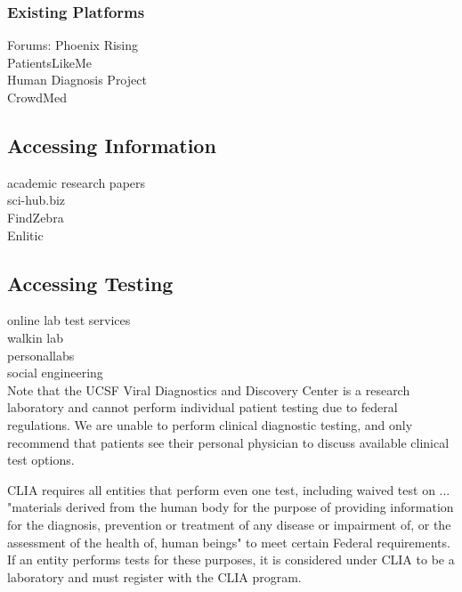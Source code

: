 \documentclass{article}
\begin{document}
\subsubsection{Existing Platforms}
Forums: Phoenix Rising\\
PatientsLikeMe\\
Human Diagnosis Project\\
CrowdMed\\

\subsection{Accessing Information}
academic research papers\\
sci-hub.biz\\
FindZebra\\
Enlitic

\cite{scholz2016platform}



\subsection{Accessing Testing}


online lab test services\\
walkin lab\\
personallabs\\
social engineering\\



Note that the UCSF Viral Diagnostics and Discovery Center is a research laboratory and cannot perform individual patient testing due to federal regulations. We are unable to perform clinical diagnostic testing, and only recommend that patients see their personal physician to discuss available clinical test options.

CLIA requires all entities that perform even one test, including waived test on ... "materials derived from the human body for the purpose of providing information for the diagnosis, prevention or treatment of any disease or impairment of, or the assessment of the health of, human beings" to meet certain Federal requirements. If an entity performs tests for these purposes, it is considered under CLIA to be a laboratory and must register with the CLIA program.
\end{document}
